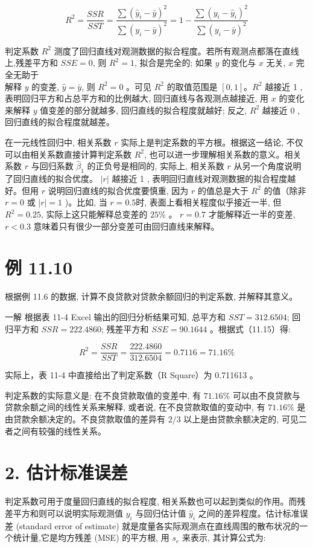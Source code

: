 \documentclass[10pt]{article}
\begin{document}
\begin{CJK*}{UTF8}{bsmi}
\begin{equation*}
R^{2}=\frac{S S R}{S S T}=\frac{\sum\left(\hat{y}_{i}-\bar{y}\right)^{2}}{\sum\left(y_{i}-\bar{y}\right)^{2}}=1-\frac{\sum\left(y_{i}-\hat{y}_{i}\right)^{2}}{\sum\left(y_{i}-\bar{y}\right)^{2}} \tag{11.15}
\end{equation*}


判定系数 $R^{2}$ 测度了回归直线对观测数据的拟合程度。若所有观测点都落在直线上,残差平方和 $S S E=0$, 则 $R^{2}=1$, 拟合是完全的; 如果 $y$ 的变化与 $x$ 无关, $x$ 完全无助于\\
解释 $y$ 的变差, $\hat{y}=\bar{y}$, 则 $R^{2}=0$ 。可见 $R^{2}$ 的取值范围是 $[0,1] 。 R^{2}$ 越接近 1 , 表明回归平方和占总平方和的比例越大, 回归直线与各观测点越接近, 用 $x$ 的变化来解释 $y$ 值变差的部分就越多, 回归直线的拟合程度就越好; 反之, $R^{2}$ 越接近 0 , 回归直线的拟合程度就越差。

在一元线性回归中, 相关系数 $r$ 实际上是判定系数的平方根。根据这一结论, 不仅可以由相关系数直接计算判定系数 $R^{2}$, 也可以进一步理解相关系数的意义。相关系数 $r$ 与回归系数 $\hat{\beta}_{1}$ 的正负号是相同的, 实际上, 相关系数 $r$ 从另一个角度说明了回归直线的拟合优度。 $|r|$ 越接近 1 , 表明回归直线对观测数据的拟合程度越好。但用 $r$ 说明回归直线的拟合优度要慎重, 因为 $r$ 的值总是大于 $R^{2}$ 的值（除非 $r=0$ 或 $|r|=1$ )。比如, 当 $r=0.5$时, 表面上看相关程度似乎接近一半, 但 $R^{2}=0.25$, 实际上这只能解释总变差的 $25 \%$ 。 $r=0.7$ 才能解释近一半的变差, $r<0.3$ 意味着只有很少一部分变差可由回归直线来解释。

\section*{例 11.10}
根据例 11.6 的数据, 计算不良贷款对贷款余额回归的判定系数, 并解释其意义。

一解 根据表 11-4 Excel 输出的回归分析结果可知, 总平方和 $S S T=312.6504$; 回归平方和 $S S R=222.4860$; 残差平方和 $S S E=90.1644$ 。根据式（11.15）得:

$$
R^{2}=\frac{S S R}{S S T}=\frac{222.4860}{312.6504}=0.7116=71.16 \%
$$

实际上，表 11-4 中直接给出了判定系数（R Square）为 0.711613 。

判定系数的实际意义是: 在不良贷款取值的变差中, 有 $71.16 \%$ 可以由不良贷款与贷款余额之间的线性关系来解释, 或者说, 在不良贷款取值的变动中, 有 $71.16 \%$ 是由贷款余额决定的。不良贷款取值的差异有 $2 / 3$ 以上是由贷款余额决定的, 可见二者之间有较强的线性关系。

\section*{2. 估计标准误差}
判定系数可用于度量回归直线的拟合程度, 相关系数也可以起到类似的作用。而残差平方和则可以说明实际观测值 $y_{i}$ 与回归估计值 $\hat{y}_{i}$ 之间的差异程度。估计标准误差 (standard error of estimate) 就是度量各实际观测点在直线周围的散布状况的一个统计量,它是均方残差 (MSE) 的平方根, 用 $s_{e}$ 来表示, 其计算公式为:



\end{CJK*}
\end{document}

